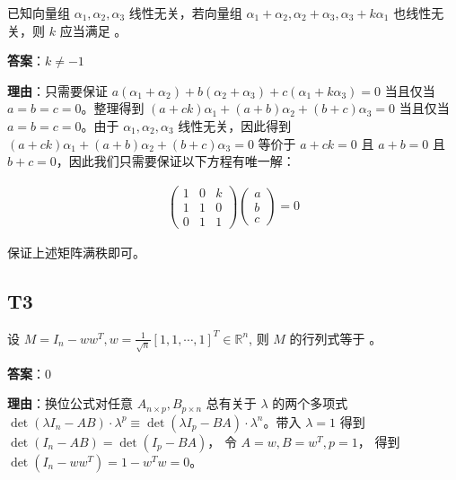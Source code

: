 \documentclass{article}
\begin{document}
\par 已知向量组 $\alpha_1, \alpha_2, \alpha_3$ 线性无关，若向量组 $\alpha_1+\alpha_2, \alpha_2+\alpha_3, \alpha_3+k\alpha_1$ 也线性无关，则 $k$ 应当满足 \underline{\phantom{empty\_space}}。

\par \textbf{答案}：$k\neq -1$

\par \textbf{理由}：只需要保证 $a(\alpha_1+\alpha_2) + b(\alpha_2+\alpha_3)+c(\alpha_1+k\alpha_3)=0$ 当且仅当 $a=b=c=0$。整理得到 $(a+ck)\alpha_1 + (a+b)\alpha_2 + (b+c)\alpha_3=0$ 当且仅当 $a=b=c=0$。由于 $\alpha_1, \alpha_2, \alpha_3$ 线性无关，因此得到 $(a+ck)\alpha_1 + (a+b)\alpha_2 + (b+c)\alpha_3=0$ 等价于 $a+ck=0$ 且 $a+b=0$ 且 $b+c=0$，因此我们只需要保证以下方程有唯一解：

\begin{align*}
	\begin{pmatrix}
		1 & 0 & k\\
		1 & 1 & 0\\
		0 & 1 & 1
	\end{pmatrix} \begin{pmatrix}
		a\\b\\c
	\end{pmatrix}=0
\end{align*}

保证上述矩阵满秩即可。

\subsection{T3}

\par 设 $M=I_n - ww^T, w=\frac{1}{\sqrt n}[ 1, 1, \cdots, 1]^T \in \mathbb R^n$, 则 $M$ 的行列式等于 \underline{\phantom{empty\_space}}。

\par \textbf{答案}：0

\par \textbf{理由}：换位公式对任意 $A_{n\times p}, B_{p\times n}$ 总有关于 $\lambda$ 的两个多项式 $\det(\lambda I_n - AB) \cdot \lambda^p \equiv \det(\lambda I_p - BA) \cdot \lambda^n $。带入 $\lambda = 1$ 得到 $\det(I_n - AB) = \det(I_p - BA)$， 令 $A=w, B=w^T, p=1$， 得到 $\det(I_n - ww^T)=1 - w^Tw=0$。
\end{document}
